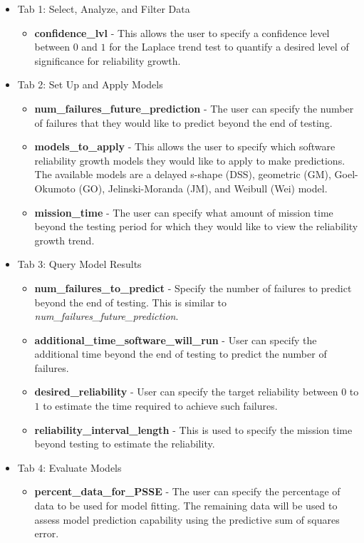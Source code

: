 \documentclass[conference]{IEEEtran}
\begin{document}
\begin{enumerate}
{\begin{itemize}
{\begin{itemize}
    \end{itemize}
  }
    \item {Tab 1: Select, Analyze, and Filter Data
    \begin{itemize}
    \item{\textbf{confidence\_lvl} - This allows the user to specify a confidence level between $0$ and $1$ for the Laplace trend test to quantify a desired level of significance for reliability growth.}
    \end{itemize}
    }
    \item {Tab 2: Set Up and Apply Models
    \begin{itemize}
      \item {\textbf{num\_failures\_future\_prediction} - The user can specify the number of failures that they would like to predict beyond the end of testing.}
      \item {\textbf{models\_to\_apply} - This allows the user to specify which software reliability growth models they would like to apply to make predictions. The available models are a delayed s-shape (DSS), geometric (GM), Goel-Okumoto (GO), Jelinski-Moranda (JM), and Weibull (Wei) model. }
      \item {\textbf{mission\_time} - The user can specify what amount of mission time beyond the testing period for which they would like to view the reliability growth trend. }
    \end{itemize}
    }
    \item {Tab 3: Query Model Results
    \begin{itemize}
      \item {\textbf{num\_failures\_to\_predict} - Specify the number of failures to predict beyond the end of testing. This is similar to \textit{num\_failures\_future\_prediction}.}
      \item {\textbf{additional\_time\_software\_will\_run} - User can specify the additional time beyond the end of testing to predict the number of failures. }
      \item {\textbf{desired\_reliability} - User can specify the target reliability between $0$ to $1$ to estimate the time required to achieve such failures.}
      \item {\textbf{reliability\_interval\_length} - This is used to specify the mission time beyond testing to estimate the reliability.}
    \end{itemize}
    }
    \item {Tab 4: Evaluate Models
    \begin{itemize}
    \item{\textbf{percent\_data\_for\_PSSE} - The user can specify the percentage of data to be used for model fitting. The remaining data will be used to assess model prediction capability using the predictive sum of squares error.}
    \end{itemize}
    }
  \end{itemize}
  }


\end{enumerate}
\end{document}
